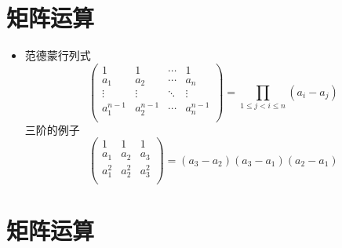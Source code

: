 \documentclass[UTF8]{ctexart}
\begin{document}
\section{矩阵运算}
\begin{itemize}
\item 范德蒙行列式
\[
\left(
\begin{array}{cccc}
1 & 1 & \cdots & 1 \\
a_{1} & a_{2} & \cdots & a_{n} \\
\vdots & \vdots & \ddots & \vdots \\
a_{1}^{n-1} & a_{2}^{n-1} & \cdots & a_{n}^{n-1} \\
\end{array}
\right) = \prod_{1 \leq j < i \leq n} (a_i - a_j)
\]
三阶的例子
\[
\left(
\begin{array}{cccc}
1 & 1 & 1 \\
a_{1} & a_{2} & a_{3} \\
a_{1}^2 & a_{2}^2 & a_{3}^2 \\
\end{array}
\right) = (a_3 - a_2)(a_3 - a_1)(a_2 - a_1)
\]
\end{itemize}

\section{矩阵运算}
\end{document}
